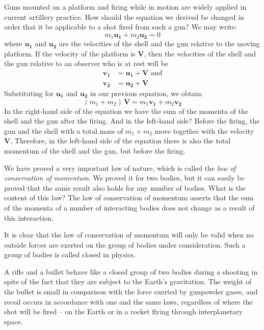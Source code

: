 Guns mounted on a platform and firing while in motion
are widely applied in current artillery practice. How
should the equation we derived be changed in order that
it be applicable to a shot fired from such a gun? We may
write:
\begin{equation*}%
m_{1}\mathbf{u_{1}} + m_{2}\mathbf{u_{2}} = 0
\end{equation*}
where $\mathbf{u_{1}}$ and $\mathbf{u_{2}}$ are the velocities of the shell and the gun relative to the moving platform. If the velocity of the platform is $\mathbf{V}$, then the velocities of the shell and the
gun relative to an observer who is at rest will be 
\begin{align*}%
\mathbf{v_{1}} & = \mathbf{u_{1}}  + \mathbf{V} \,\, \textrm{and}\\
\mathbf{v_{2}} & = \mathbf{u_{2}}  + \mathbf{V}
\end{align*}
Substituting for $\mathbf{u_{1}}$ and $\mathbf{u_{2}}$ in our previous equation, we
obtain:
\begin{equation*}%
(m_{1} + m_{2}) \, \mathbf{V} = m_{1}\mathbf{v_{1}} + m_{2}\mathbf{v_{2}}
\end{equation*}
In the right-hand side of the equation we have the sum
of the momenta of the shell and the gun after the firing.
And in the left-hand side? Before the firing, the gun and
the shell with a total mass of $m_{1}+ m_{2}$ move together with the velocity $\mathbf{V}$. Therefore, in the left-hand side of
the equation there is also the total momentum of the shell
and the gun, but before the firing.

We have proved a very important law of nature, which
is called the \emph{law of conservation of momentum}. We proved
it for two bodies, but it can easily be proved that the
same result also holds for any number of bodies. What is
the content of this law? The law of conservation of momentum asserts that the sum of the momenta of a number
of interacting bodies does not change as a result of this
interaction.

It is clear that the law of conservation of momentum
will only be valid when no outside forces are exerted on
the group of bodies under consideration. Such a group of
bodies is called closed in physics.

A rifle and a bullet behave like a closed group of two
bodies during a shooting in spite of the fact that they
are subject to the Earth's gravitation. The weight of
the bullet is small in comparison with the force exerted
by gunpowder gases, and recoil occurs in accordance with
one and the same laws, regardless of where the shot will
be fired -- on the Earth or in a rocket flying through interplanetary space.

